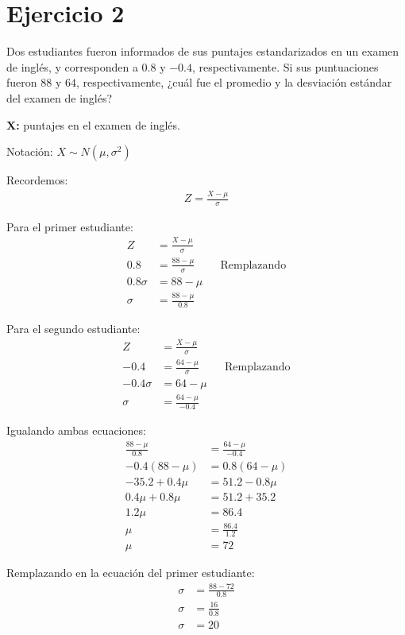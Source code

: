 \documentclass{templateNote}
\begin{document}
\newpage
\section*{Ejercicio 2}
Dos estudiantes fueron informados de sus puntajes estandarizados en un examen de inglés, y corresponden a $0.8$ y $-0.4$, respectivamente. Si sus puntuaciones fueron $88$ y $64$, respectivamente, ¿cuál fue el promedio y la desviación estándar del examen de inglés?

\textbf{X:} puntajes en el examen de inglés.

Notación: $X \sim N(\mu, \sigma^2)$

Recordemos:
\begin{align*}
  Z = \frac{X - \mu}{\sigma}
\end{align*}

Para el primer estudiante:
\begin{align*}
  Z &= \frac{X - \mu}{\sigma} \\
  0.8 &= \frac{88 - \mu}{\sigma} && \text{Remplazando} \\
  0.8\sigma &= 88 - \mu \\
  \sigma &= \frac{88 - \mu}{0.8}
\end{align*}

Para el segundo estudiante:
\begin{align*}
  Z &= \frac{X - \mu}{\sigma} \\
  -0.4 &= \frac{64 - \mu}{\sigma} && \text{Remplazando} \\
  -0.4\sigma &= 64 - \mu \\
  \sigma &= \frac{64 - \mu}{-0.4}
\end{align*}

Igualando ambas ecuaciones:
\begin{align*}
  \frac{88 - \mu}{0.8} &= \frac{64 - \mu}{-0.4} \\
  -0.4(88 - \mu) &= 0.8(64 - \mu) \\
  -35.2 + 0.4\mu &= 51.2 - 0.8\mu \\
  0.4\mu + 0.8\mu &= 51.2 + 35.2 \\
  1.2\mu &= 86.4 \\
  \mu &= \frac{86.4}{1.2} \\
  \mu &= 72
\end{align*}

Remplazando en la ecuación del primer estudiante:
\begin{align*}
  \sigma &= \frac{88 - 72}{0.8} \\
  \sigma &= \frac{16}{0.8} \\
  \sigma &= 20
\end{align*}
\end{document}
